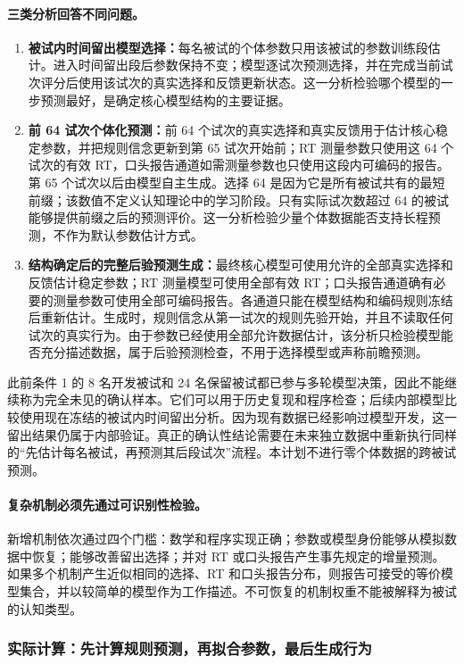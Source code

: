 \paragraph{三类分析回答不同问题。}
\begin{enumerate}
    \item \textbf{被试内时间留出模型选择：}每名被试的个体参数只用该被试的参数训练段估计。进入时间留出段后参数保持不变；模型逐试次预测选择，并在完成当前试次评分后使用该试次的真实选择和反馈更新状态。这一分析检验哪个模型的一步预测最好，是确定核心模型结构的主要证据。
    \item \textbf{前 64 试次个体化预测：}前 64 个试次的真实选择和真实反馈用于估计核心稳定参数，并把规则信念更新到第 65 试次开始前；RT 测量参数只使用这 64 个试次的有效 RT，口头报告通道如需测量参数也只使用这段内可编码的报告。第 65 个试次以后由模型自主生成。选择 64 是因为它是所有被试共有的最短前缀；该数值不定义认知理论中的学习阶段。只有实际试次数超过 64 的被试能够提供前缀之后的预测评价。这一分析检验少量个体数据能否支持长程预测，不作为默认参数估计方式。
    \item \textbf{结构确定后的完整后验预测生成：}最终核心模型可使用允许的全部真实选择和反馈估计稳定参数；RT 测量模型可使用全部有效 RT；口头报告通道确有必要的测量参数可使用全部可编码报告。各通道只能在模型结构和编码规则冻结后重新估计。生成时，规则信念从第一试次的规则先验开始，并且不读取任何试次的真实行为。由于参数已经使用全部允许数据估计，该分析只检验模型能否充分描述数据，属于后验预测检查，不用于选择模型或声称前瞻预测。
\end{enumerate}
此前条件 1 的 8 名开发被试和 24 名保留被试都已参与多轮模型决策，因此不能继续称为完全未见的确认样本。它们可以用于历史复现和程序检查；后续内部模型比较使用现在冻结的被试内时间留出分析。因为现有数据已经影响过模型开发，这一留出结果仍属于内部验证。真正的确认性结论需要在未来独立数据中重新执行同样的“先估计每名被试，再预测其后段试次”流程。本计划不进行零个体数据的跨被试预测。

\paragraph{复杂机制必须先通过可识别性检验。}
新增机制依次通过四个门槛：数学和程序实现正确；参数或模型身份能够从模拟数据中恢复；能够改善留出选择；并对 RT 或口头报告产生事先规定的增量预测。如果多个机制产生近似相同的选择、RT 和口头报告分布，则报告可接受的等价模型集合，并以较简单的模型作为工作描述。不可恢复的机制权重不能被解释为被试的认知类型。


\subsubsection{实际计算：先计算规则预测，再拟合参数，最后生成行为}

